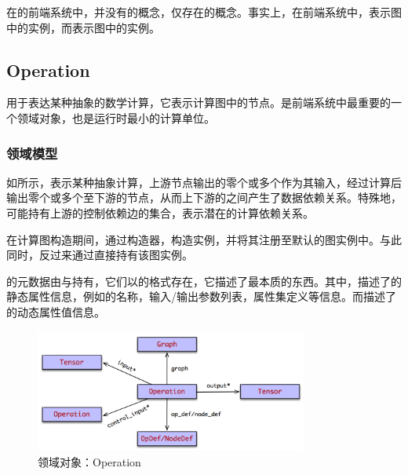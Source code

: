 \begin{content}

在的前端系统中，并没有的概念，仅存在的概念。事实上，在前端系统中，表示图中的实例，而表示图中的实例。

\subsection{Operation}

用于表达某种抽象的数学计算，它表示计算图中的节点。是前端系统中最重要的一个领域对象，也是\tf{}运行时最小的计算单位。

\subsubsection{领域模型}

如所示，表示某种抽象计算，上游节点输出的零个或多个作为其输入，经过计算后输出零个或多个至下游的节点，从而上下游的之间产生了数据依赖关系。特殊地，可能持有上游的控制依赖边的集合，表示潜在的计算依赖关系。

在计算图构造期间，通过构造器，构造实例，并将其注册至默认的图实例中。与此同时，反过来通过直接持有该图实例。

的元数据由与持有，它们以的格式存在，它描述了最本质的东西。其中，描述了的静态属性信息，例如的名称，输入/输出参数列表，属性集定义等信息。而描述了的动态属性值信息。

\begin{figure}[H]
\centering
\includegraphics[width=0.8\textwidth]{figures/py-operation.png}
\caption{领域对象：Operation}
 \label{fig:py-operation}
\end{figure}


\end{content}
